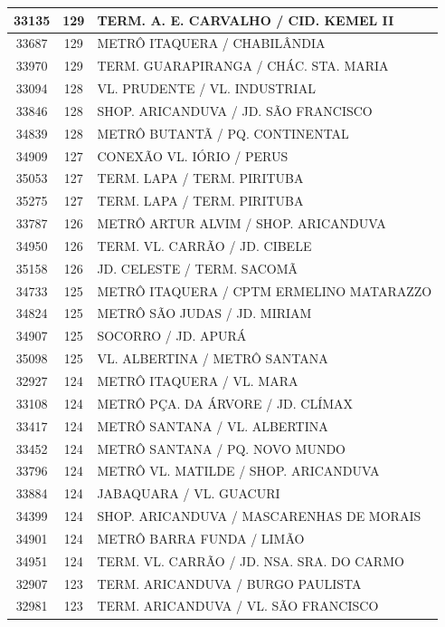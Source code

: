 \documentclass[
	12pt,				%
	oneside,			%
	a4paper,			%
	english,			%
	brazil				%
	]{abntex2ppgsi}
\begin{document}
{{{\begin{apendicesenv}
\begin{longtable}{c|c|p{7cm}}
 \hline 
33135 &	129 &	TERM. A. E. CARVALHO / CID. KEMEL II \\ 
 \hline 
33687 &	129 &	METRÔ ITAQUERA / CHABILÂNDIA \\ 
 \hline 
33970 &	129 &	TERM. GUARAPIRANGA / CHÁC. STA. MARIA \\ 
 \hline 
33094 &	128 &	VL. PRUDENTE / VL. INDUSTRIAL \\ 
 \hline 
33846 &	128 &	SHOP. ARICANDUVA / JD. SÃO FRANCISCO \\ 
 \hline 
34839 &	128 &	METRÔ BUTANTÃ / PQ. CONTINENTAL \\ 
 \hline 
34909 &	127 &	CONEXÃO VL. IÓRIO / PERUS \\ 
 \hline 
35053 &	127 &	TERM. LAPA / TERM. PIRITUBA \\ 
 \hline 
35275 &	127 &	TERM. LAPA / TERM. PIRITUBA \\ 
 \hline 
33787 &	126 &	METRÔ ARTUR ALVIM / SHOP. ARICANDUVA \\ 
 \hline 
34950 &	126 &	TERM. VL. CARRÃO / JD. CIBELE \\ 
 \hline 
35158 &	126 &	JD. CELESTE / TERM. SACOMÃ \\ 
 \hline 
34733 &	125 &	METRÔ ITAQUERA / CPTM ERMELINO MATARAZZO \\ 
 \hline 
34824 &	125 &	METRÔ SÃO JUDAS / JD. MIRIAM \\ 
 \hline 
34907 &	125 &	SOCORRO / JD. APURÁ \\ 
 \hline 
35098 &	125 &	VL. ALBERTINA / METRÔ SANTANA \\ 
 \hline 
32927 &	124 &	METRÔ ITAQUERA / VL. MARA \\ 
 \hline 
33108 &	124 &	METRÔ PÇA. DA ÁRVORE / JD. CLÍMAX \\ 
 \hline 
33417 &	124 &	METRÔ SANTANA / VL. ALBERTINA \\ 
 \hline 
33452 &	124 &	METRÔ SANTANA / PQ. NOVO MUNDO \\ 
 \hline 
33796 &	124 &	METRÔ VL. MATILDE / SHOP. ARICANDUVA \\ 
 \hline 
33884 &	124 &	JABAQUARA / VL. GUACURI \\ 
 \hline 
34399 &	124 &	SHOP. ARICANDUVA / MASCARENHAS DE MORAIS \\ 
 \hline 
34901 &	124 &	METRÔ BARRA FUNDA / LIMÃO \\ 
 \hline 
34951 &	124 &	TERM. VL. CARRÃO / JD. NSA. SRA. DO CARMO \\ 
 \hline 
32907 &	123 &	TERM. ARICANDUVA / BURGO PAULISTA \\ 
 \hline 
32981 &	123 &	TERM. ARICANDUVA / VL. SÃO FRANCISCO \\ 

\end{longtable}
\end{apendicesenv}}}}
\end{document}
